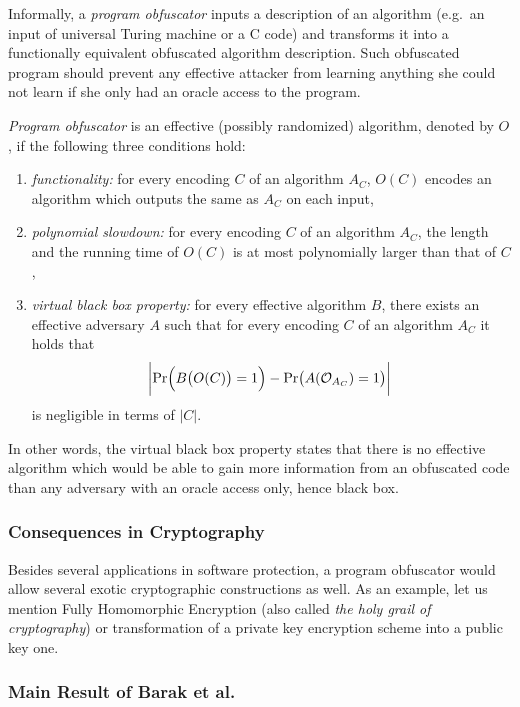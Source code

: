 	Informally, a {\em program obfuscator} inputs a description of an algorithm (e.g.\ an input of universal Turing machine or a C code) and transforms it into a functionally equivalent obfuscated algorithm description. Such obfuscated program should prevent any effective attacker from learning anything she could not learn if she only had an oracle access to the program.
	
	\begin{defn}
	\label{def:obfus}
		{\em Program obfuscator} is an effective (possibly randomized) algorithm, denoted by $O$, if the following three conditions hold:
		\begin{enumerate}
			\item {\em functionality:} for every encoding $C$ of an algorithm $A_C$, $O(C)$ encodes an algorithm which outputs the same as $A_C$ on each input,
			\item {\em polynomial slowdown:} for every encoding $C$ of an algorithm $A_C$, the length and the running time of $O(C)$ is at most polynomially larger than that of $C$,
			\item {\em virtual black box property:} for every effective algorithm $B$, there exists an effective adversary $A$ such that for every encoding $C$ of an algorithm $A_C$ it holds that
			\[
				\biggl| \Pr\Bigl(B\bigl(O(C)\bigr)=1\Bigr) - \Pr\bigl(A({\cal O}_{A_C})=1\bigr) \biggr| \
			\]
			is negligible in terms of $|C|$.
		\end{enumerate}
	\end{defn}
	
	In other words, the virtual black box property states that there is no effective algorithm which would be able to gain more information from an obfuscated code than any adversary with an oracle access only, hence black box.

\subsubsection{Consequences in Cryptography}
	
	Besides several applications in software protection, a program obfuscator would allow several exotic cryptographic constructions as well. As an example, let us mention Fully Homomorphic Encryption (also called {\em the holy grail of cryptography}) or transformation of a private key encryption scheme into a public key one.

\subsubsection{Main Result of Barak et al.}
	
